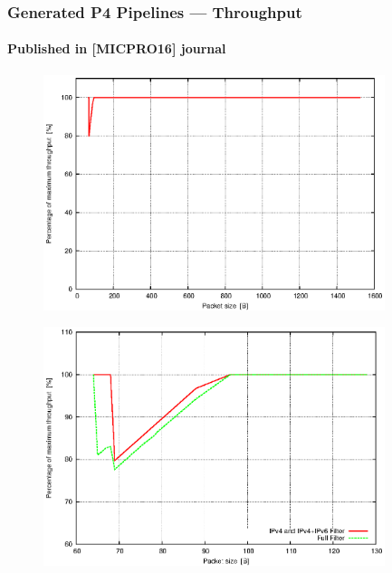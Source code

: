 \begin{frame}[allowframebreaks]
    \frametitle{Generated P4 Pipelines --- Throughput}
    \framesubtitle{Published in [MICPRO16] journal}
    
    \begin{figure}
        \centering
        \includegraphics[width=0.89\textwidth]{pic/graph/table/ipv46_throughput}
    \end{figure}
    
    \begin{figure}
        \centering
        \includegraphics[width=0.89\textwidth]{pic/graph/table/detail_throughput_ineff}
    \end{figure}
\end{frame}

